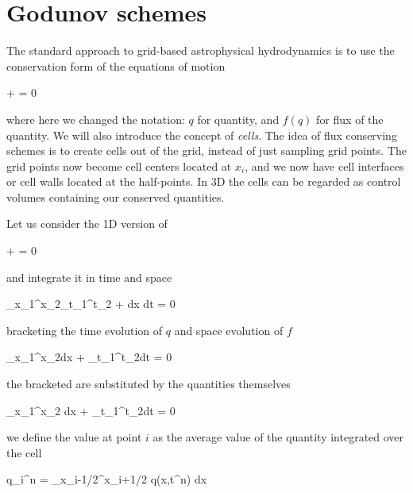 \section{Godunov schemes}

The standard
approach to grid-based astrophysical hydrodynamics is to use the
conservation form of the equations of motion 

\beq
{} +  = 0 
\label{eq:flux-godunov}
\eeq

where here we changed the notation: $q$ for quantity, and $f(q)$ for
flux of the quantity. We will also introduce the concept of {\it cells}. The idea of flux conserving schemes is to create cells out of the grid, instead of just sampling grid
points. The grid points now become cell centers located at $x_i$, and
we now have cell interfaces or cell walls located at the
half-points. In 3D the cells can  be regarded as control volumes
containing our conserved quantities. 

Let us consider the 1D version of 

\beq
{} +  = 0 
\label{eq:flux-godunov-1D}
\eeq

and integrate it in time and space

\beq
\int_{x_1}^{x_2}\int_{t_1}^{t_2} +
 dx dt = 0 
\eeq

bracketing the time evolution of $q$ and space evolution of $f$

\beq
\int_{x_1}^{x_2}dx +
\int_{t_1}^{t_2}dt = 0 
\eeq

the bracketed are substituted by the quantities themselves

\beq
\int_{x_1}^{x_2} \left[q(t_2)-q(t_1)\right] dx +
\int_{t_1}^{t_2}\left[f(x_2)-f(x_1) \right]dt = 0 
\eeq




we define the value at point $i$ as the average value of the
quantity integrated over the cell 

\beq
q_i^n =  \int_{x_i-1/2}^{x_i+1/2} q(x,t^n) dx 
\eeq

